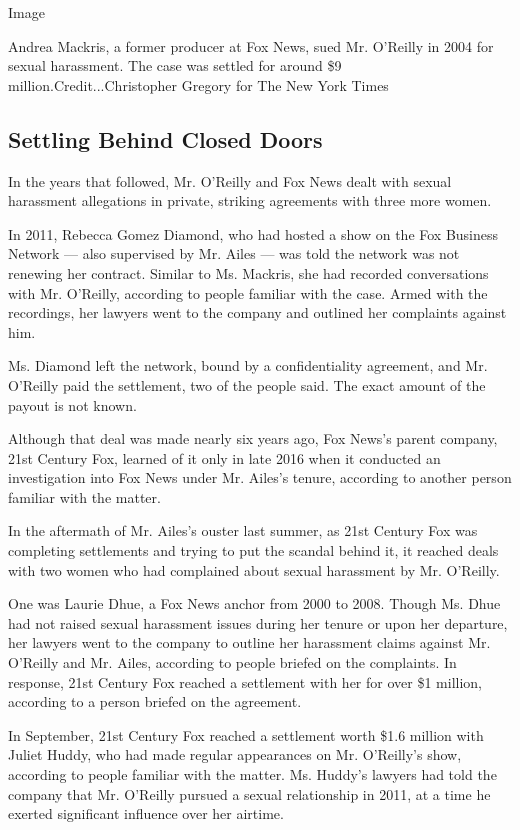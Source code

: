 Image

Andrea Mackris, a former producer at Fox News, sued Mr. O'Reilly in 2004
for sexual harassment. The case was settled for around \$9
million.Credit...Christopher Gregory for The New York Times

\hypertarget{settling-behind-closed-doors}{%
\subsection{Settling Behind Closed
Doors}\label{settling-behind-closed-doors}}

In the years that followed, Mr. O'Reilly and Fox News dealt with sexual
harassment allegations in private, striking agreements with three more
women.

In 2011, Rebecca Gomez Diamond, who had hosted a show on the Fox
Business Network --- also supervised by Mr. Ailes --- was told the
network was not renewing her contract. Similar to Ms. Mackris, she had
recorded conversations with Mr. O'Reilly, according to people familiar
with the case. Armed with the recordings, her lawyers went to the
company and outlined her complaints against him.

Ms. Diamond left the network, bound by a confidentiality agreement, and
Mr. O'Reilly paid the settlement, two of the people said. The exact
amount of the payout is not known.

Although that deal was made nearly six years ago, Fox News's parent
company, 21st Century Fox, learned of it only in late 2016 when it
conducted an investigation into Fox News under Mr. Ailes's tenure,
according to another person familiar with the matter.

In the aftermath of Mr. Ailes's ouster last summer, as 21st Century Fox
was completing settlements and trying to put the scandal behind it, it
reached deals with two women who had complained about sexual harassment
by Mr. O'Reilly.

One was Laurie Dhue, a Fox News anchor from 2000 to 2008. Though Ms.
Dhue had not raised sexual harassment issues during her tenure or upon
her departure, her lawyers went to the company to outline her harassment
claims against Mr. O'Reilly and Mr. Ailes, according to people briefed
on the complaints. In response, 21st Century Fox reached a settlement
with her for over \$1 million, according to a person briefed on the
agreement.

In September, 21st Century Fox reached a settlement worth \$1.6 million
with Juliet Huddy, who had made regular appearances on Mr. O'Reilly's
show, according to people familiar with the matter. Ms. Huddy's lawyers
had told the company that Mr. O'Reilly pursued a sexual relationship in
2011, at a time he exerted significant influence over her airtime.


